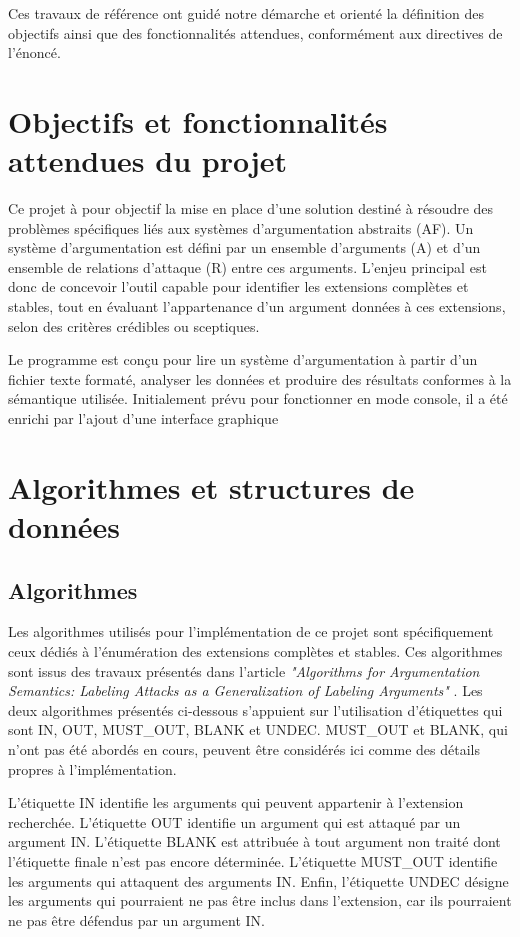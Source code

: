 \documentclass{rapportECL}
\begin{document}
Ces travaux de référence ont guidé notre démarche et orienté la définition des objectifs ainsi que des fonctionnalités attendues, conformément aux directives de l'énoncé.

\section{Objectifs et fonctionnalités attendues du projet}
Ce projet à pour objectif la mise en place d'une solution destiné à résoudre des problèmes spécifiques liés aux systèmes d'argumentation abstraits (AF). 
Un système d'argumentation est défini par un ensemble d'arguments (A) et d’un ensemble de relations d'attaque (R) entre ces arguments. 
L’enjeu principal est donc de concevoir l'outil capable pour identifier les extensions complètes et stables, tout en évaluant l’appartenance d’un argument données à ces extensions, selon des critères crédibles ou sceptiques.


Le programme est conçu pour lire un système d'argumentation à partir d’un fichier texte formaté, analyser les données et produire des résultats conformes à la sémantique utilisée. Initialement prévu pour fonctionner en mode console, il a été enrichi par l’ajout d’une interface graphique
\section{Algorithmes et structures de données} 


\subsection{Algorithmes}
Les algorithmes utilisés pour l'implémentation de ce projet sont spécifiquement ceux dédiés à l'énumération des extensions complètes 
et stables. Ces algorithmes sont issus des travaux présentés dans l'article 
\textit{"Algorithms for Argumentation Semantics: Labeling Attacks as a Generalization of Labeling Arguments"} \cite{c}.
Les deux algorithmes présentés ci-dessous s’appuient sur l’utilisation d’étiquettes qui sont IN, OUT,  {MUST\_OUT}, BLANK et UNDEC.
{MUST\_OUT} et BLANK, qui n’ont pas été abordés en cours, peuvent être considérés ici comme des détails propres à l’implémentation.

L'étiquette {IN} identifie les arguments qui peuvent appartenir à  l'extension recherchée. L'étiquette {OUT} 
identifie un argument qui est attaqué par un argument {IN}. L'étiquette {BLANK} est attribuée à tout argument non 
traité dont l'étiquette finale n'est pas encore déterminée. L'étiquette {MUST\_OUT} identifie les arguments qui attaquent des 
arguments {IN}. Enfin, l'étiquette {UNDEC} désigne les arguments qui pourraient ne pas être inclus dans  l'extension, car ils pourraient ne pas être défendus par un argument {IN}.
\end{document}
